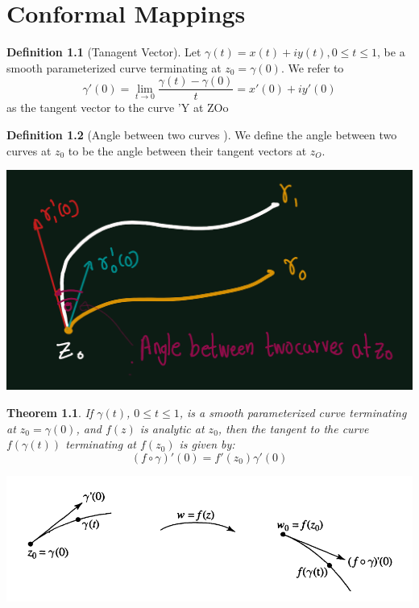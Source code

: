 \documentclass[
]{book}
\newtheorem{theorem}{Theorem}[chapter]
\theoremstyle{definition}
\newtheorem{definition}{Definition}[chapter]
\theoremstyle{definition}
\theoremstyle{definition}
\theoremstyle{definition}
\theoremstyle{remark}
\begin{document}
\chapter{Conformal Mappings}\label{conformal-mappings}

\begin{definition}[Tanagent Vector]
\protect\hypertarget{def:unnamed-chunk-19}{}\label{def:unnamed-chunk-19}Let \(\gamma(t) = x(t) + iy(t), 0\leq  t \leq  1\), be a smooth parameterized curve terminating at \(z_0 = \gamma(0)\). We refer to
\[\gamma'(0) = \lim_{t \to 0} \frac{\gamma(t)-\gamma(0)}{t} = x'(0) + iy'(0)\]
as the tangent vector to the curve 'Y at ZOo
\end{definition}

\begin{definition}[Angle between two curves ]
\protect\hypertarget{def:unnamed-chunk-20}{}\label{def:unnamed-chunk-20}We define the angle between two curves
at \(z_0\) to be the angle between their tangent vectors at \(z_O\).
\end{definition}

\includegraphics[width=19.6in]{figures/Confromal_mapping/fig1}

\begin{theorem}
\protect\hypertarget{thm:unnamed-chunk-22}{}\label{thm:unnamed-chunk-22}If \(\gamma(t)\), \(0 \leq t \leq 1\), is a smooth parameterized curve terminating at \(z_0 = \gamma(0)\), and \(f(z)\) is analytic at \(z_0\), then the tangent to the curve \(f(\gamma(t))\) terminating at \(f(z_0)\) is given by:
\begin{equation}
(f \circ \gamma)'(0) = f'(z_0)\gamma'(0)
\end{equation}
\end{theorem}

\includegraphics[width=13in]{figures/Confromal_mapping/fig2}
\end{document}
